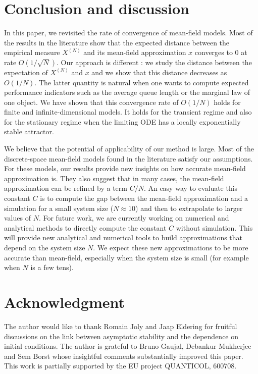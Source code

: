 \documentclass[acmlarge]{acmart}
\newcommand\XN{X^{(N)}}
\begin{document}
\section{Conclusion and discussion}
\label{sec:conclusion}

In this paper, we revisited the rate of convergence of mean-field
models. Most of the results in the literature show that the expected
distance between the empirical measure $\XN$ and its mean-field
approximation $x$ converges to $0$ at rate $O(1/\sqrt{N})$. Our
approach is different : we study the distance between the expectation
of $\XN$ and $x$ and we show that this distance decreases as
$O(1/N)$. The latter quantity is natural when one wants to compute
expected performance indicators such as the average queue length or
the marginal law of one object.  We have shown that this convergence
rate of $O(1/N)$ holds for finite and infinite-dimensional models. It
holds for the transient regime and also for the stationary regime when
the limiting ODE has a locally exponentially stable attractor.

We believe that the potential of applicability of our method is
large. Most of the discrete-space mean-field models found in the
literature satisfy our assumptions.  For these models, our results
provide new insights on how accurate mean-field approximation is. They
also suggest that in many cases, the mean-field approximation can be
refined by a term $C/N$.  An easy way to evaluate this constant $C$ is
to compute the gap between the mean-field approximation and a
simulation for a small system size ($N\approx10$) and then to
extrapolate to larger values of $N$.  For future work, we are
currently working on numerical and analytical methods to directly
compute the constant $C$ without simulation.  This will provide new
analytical and numerical tools to build approximations that depend on
the system size $N$. We expect these new approximations to be more
accurate than mean-field, especially when the system size is small
(for example when $N$ is a few tens).

\section{Acknowledgment}

The author would like to thank Romain Joly and Jaap Eldering for
fruitful discussions on the link between asymptotic stability and the
dependence on initial conditions. The author is grateful to Bruno
Gaujal, Debankur Mukherjee and Sem Borst whose insightful comments
substantially improved this paper.  This work is partially supported
by the EU project QUANTICOL, 600708.



\end{document}
